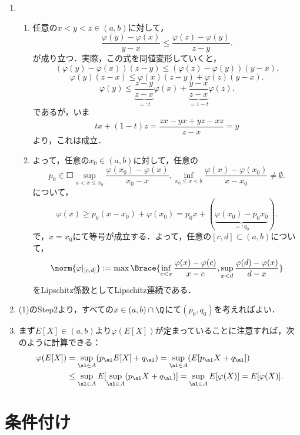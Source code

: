 \documentclass[uplatex,dvipdfmx]{jsreport}
\begin{document}
\begin{Proof}\mbox{}
    \begin{enumerate}
        \item \begin{enumerate}[{Step}1]
            \item 任意の$x<y<z\in(a,b)$に対して，
            \[\frac{\varphi(y)-\varphi(x)}{y-x}\le\frac{\varphi(z)-\varphi(y)}{z-y}.\]
            が成り立つ．実際，この式を同値変形していくと，
            \[(\varphi(y)-\varphi(x))(z-y)\le(\varphi(z)-\varphi(y))(y-x).\]
            \[\varphi(y)(z-x)\le\varphi(x)(z-y)+\varphi(z)(y-x).\]
            \[\varphi(y)\le\underbrace{\frac{z-y}{z-x}}_{=:t}\varphi(x)+\underbrace{\frac{y-x}{z-x}}_{=1-t}\varphi(z).\]
            であるが，いま
            \[tx+(1-t)z=\frac{zx-yx+yz-xz}{z-x}=y\]
            より，これは成立．
            \item よって，任意の$x_0\in(a,b)$に対して，任意の
            \[p_0\in\Square{\sup_{a<x\le x_0}\frac{\varphi(x_0)-\varphi(x)}{x_0-x},\inf_{x_0\le x<b}\frac{\varphi(x)-\varphi(x_0)}{x-x_0}}\ne\emptyset.\]
            について，
            \[\varphi(x)\ge p_0(x-x_0)+\varphi(x_0)=p_0x+(\underbrace{\varphi(x_0)-p_0x_0}_{=:q_0}).\]
            で，$x=x_0$にて等号が成立する．よって，任意の$[c,d]\subset(a,b)$について，
            \[\norm{\varphi|_{[c,d]}}:=\max\Brace{\inf_{c<x}\frac{\varphi(x)-\varphi(c)}{x-c},\sup_{x<d}\frac{\varphi(d)-\varphi(x)}{d-x}}\]
            をLipschitz係数としてLipschitz連続である．
        \end{enumerate}
        \item (1)のStep2より，すべての$x\in(a,b)\cap\Q$にて$(p_0,q_0)$を考えればよい．
        \item まず$E[X]\in(a,b)$より$\varphi(E[X])$が定まっていることに注意すれば，次のように計算できる：
        \begin{align*}
            \varphi(E[X])&=\sup_{\al\in A}(p_\al E[X]+q_\al)
            =\sup_{\al\in A}(E[p_\al X+q_\al])\\
            &\le\sup_{\al\in A}E[\sup_{\al\in A}(p_\al X+q_\al)]=\sup_{\al\in A}E[\varphi(X)]=E[\varphi(X)].
        \end{align*}
    \end{enumerate}
\end{Proof}

\section{条件付け}
\end{document}
